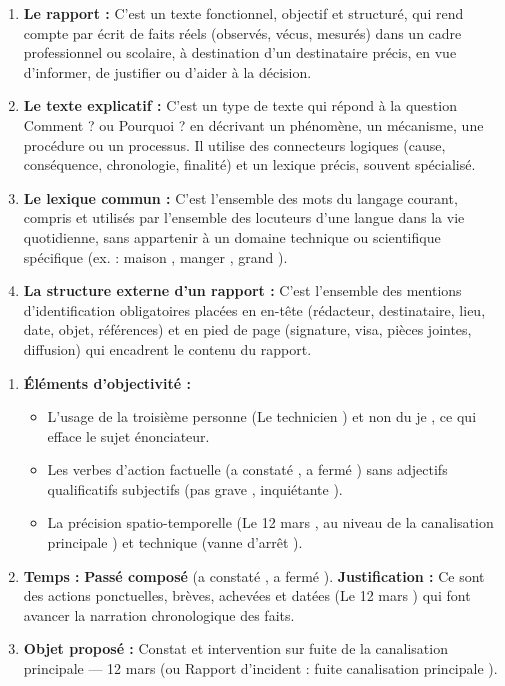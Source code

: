\documentclass[11pt]{article}
\begin{document}
\begin{corrige}
\begin{enumerate}
\item \textbf{Le rapport :} C'est un texte fonctionnel, objectif et structuré, qui rend compte par écrit de faits réels (observés, vécus, mesurés) dans un cadre professionnel ou scolaire, à destination d'un destinataire précis, en vue d'informer, de justifier ou d'aider à la décision.
\item \textbf{Le texte explicatif :} C'est un type de texte qui répond à la question \og Comment ? \fg ou \og Pourquoi ? \fg en décrivant un phénomène, un mécanisme, une procédure ou un processus. Il utilise des connecteurs logiques (cause, conséquence, chronologie, finalité) et un lexique précis, souvent spécialisé.
\item \textbf{Le lexique commun :} C'est l'ensemble des mots du langage courant, compris et utilisés par l'ensemble des locuteurs d'une langue dans la vie quotidienne, sans appartenir à un domaine technique ou scientifique spécifique (ex. : \og maison \fg, \og manger \fg, \og grand \fg).
\item \textbf{La structure externe d'un rapport :} C'est l'ensemble des mentions d'identification obligatoires placées en en-tête (rédacteur, destinataire, lieu, date, objet, références) et en pied de page (signature, visa, pièces jointes, diffusion) qui encadrent le contenu du rapport.
\end{enumerate}
\end{corrige}

\begin{corrige}
\begin{enumerate}
\item \textbf{Éléments d'objectivité :}
\begin{itemize}
\item L'usage de la troisième personne (\og Le technicien \fg) et non du \og je \fg, ce qui efface le sujet énonciateur.
\item Les verbes d'action factuelle (\og a constaté \fg, \og a fermé \fg) sans adjectifs qualificatifs subjectifs (pas \og grave \fg, \og inquiétante \fg).
\item La précision spatio-temporelle (\og Le 12 mars \fg, \og au niveau de la canalisation principale \fg) et technique (\og vanne d'arrêt \fg).
\end{itemize}
\item \textbf{Temps :} \textbf{Passé composé} (\og a constaté \fg, \og a fermé \fg). \textbf{Justification :} Ce sont des actions ponctuelles, brèves, achevées et datées (\og Le 12 mars \fg) qui font avancer la narration chronologique des faits.
\item \textbf{Objet proposé :} \og Constat et intervention sur fuite de la canalisation principale — 12 mars \fg (ou \og Rapport d'incident : fuite canalisation principale \fg).
\end{enumerate}
\end{corrige}
\end{document}
